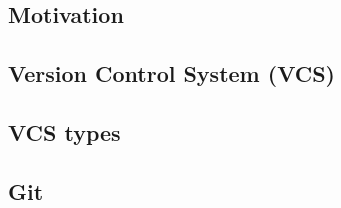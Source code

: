 \subsection{Motivation}



\subsection{Version Control System (VCS)}



\subsection{VCS types}



\subsection{Git}



